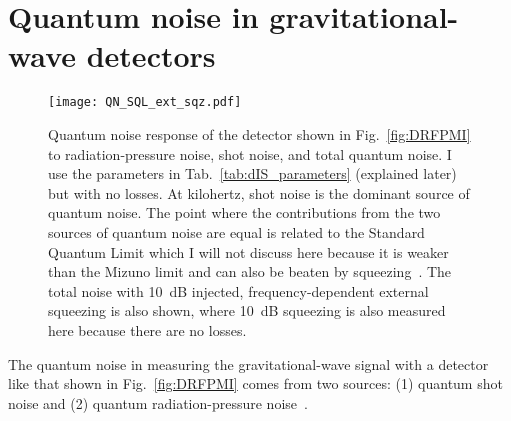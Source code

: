 \section{Quantum noise in gravitational-wave detectors}
\label{sec:qnoise_GW_IFO}


\begin{figure}[ht]
	\centering
	\texttt{[image: QN\_SQL\_ext\_sqz.pdf]}
	\caption{ Quantum noise response of the detector shown in Fig.~\ref{fig:DRFPMI} to radiation-pressure noise, shot noise, and total quantum noise. I use the parameters in Tab.~\ref{tab:dIS_parameters} (explained later) but with no losses. At kilohertz, shot noise is the dominant source of quantum noise. The point where the contributions from the two sources of quantum noise are equal is related to the Standard Quantum Limit which I will not discuss here because it is weaker than the Mizuno limit and can also be beaten by squeezing~\cite{miaoFundamentalQuantumLimit2017}.
	The total noise with 10~dB injected, frequency-dependent external squeezing is also shown, where 10~dB squeezing is also measured here because there are no losses. %
	} %
	\label{fig:simplifed_QN_response_conventional}
\end{figure}

The quantum noise in measuring the gravitational-wave signal with a detector like that shown in Fig.~\ref{fig:DRFPMI} comes from two sources: (1) quantum shot noise and (2) quantum radiation-pressure noise~\cite{PhysRevD.23.1693,corbitt_2003}.

